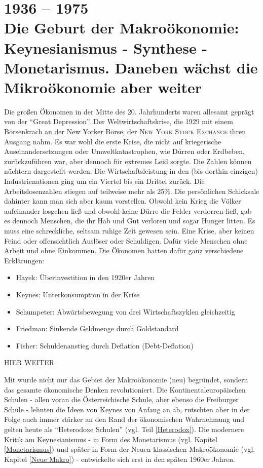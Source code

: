 %
%
%


\part{1936 -- 1975\\Die Geburt der Makroökonomie: Keynesianismus - Synthese - Monetarismus. Daneben wächst die Mikroökonomie aber weiter}

Die großen Ökonomen in der Mitte des 20. Jahrhunderts waren allesamt geprägt von der "`Great Depression"'. Der Weltwirtschaftskrise, die 1929 mit einem Börsenkrach an der New Yorker Börse, der \textsc{New York Stock Exchange} ihren Ausgang nahm. Es war wohl die erste Krise, die nicht auf kriegerische Auseinandersetzungen oder Umweltkatastrophen, wie Dürren oder Erdbeben, zurückzuführen war, aber dennoch für extremes Leid sorgte. Die Zahlen können nüchtern dargestellt werden: Die Wirtschaftsleistung in den (bis dorthin einzigen) Industrienationen ging um ein Viertel bis ein Drittel zurück. Die Arbeitslosenzahlen stiegen auf teilweise mehr als 25\%. Die persönlichen Schicksale dahinter kann man sich aber kaum vorstellen. Obwohl kein Krieg die Völker aufeinander losgehen ließ und obwohl keine Dürre die Felder verdorren ließ, gab es dennoch Menschen, die ihr Hab und Gut verloren und sogar Hunger litten. Es muss eine schreckliche, seltsam ruhige Zeit gewesen sein. Eine Krise, aber keinen Feind oder offensichtlich Auslöser oder Schuldigen. Dafür viele Menschen ohne Arbeit und ohne Einkommen.
Die Ökonomen hatten dafür ganz verschiedene Erklärungen:
\begin{itemize}
	\item Hayek: Überinvestition in den 1920er Jahren
	\item Keynes: Unterkonsumption in der Krise
	\item Schumpeter: Abwärtsbewegung von drei Wirtschaftszyklen gleichzeitig
	\item Friedman: Sinkende Geldmenge durch Goldstandard
	\item Fisher: Schuldenanstieg durch Deflation (Debt-Deflation)
\end{itemize}

HIER WEITER


Mit \textcite{Keynes1936} wurde nicht nur das Gebiet der Makroökonomie (neu) begründet, sondern das gesamte ökonomische Denken revolutioniert. Die Kontinentaleuropäischen Schulen - allen voran die Österreichische Schule, aber ebenso die Freiburger Schule - lehnten die Ideen von Keynes von Anfang an ab, rutschten aber in der Folge auch immer stärker an den Rand der ökonomischen Wahrnehmung und gelten heute als "`Heterodoxe Schulen"' (vgl. Teil \ref{Heterodox}). Die modernere Kritik am Keynesianismus - in Form des Monetarismus (vgl. Kapitel \ref{Monetarismus}) und später in Form der Neuen klassischen Makroökonomie (vgl. Kapitel \ref{Neue Makro}) - entwickelte sich erst in den späten 1960er Jahren. 

